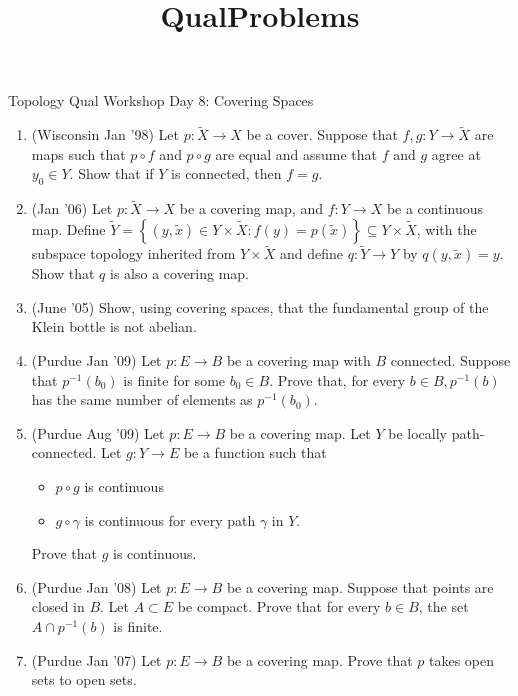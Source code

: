 \documentclass[psamsfonts, 11pt, reqno]{amsart}
\title{QualProblems}
\renewcommand{\tilde}{\widetilde}
\begin{document}
\begin{center}
\begin{large}
Topology Qual Workshop Day 8: Covering Spaces
\end{large}
\end{center}
\vspace{.25in}

\begin{enumerate}

\item (Wisconsin Jan '98) Let $p: \tilde{X} \rightarrow X$ be a cover. Suppose that $f,g: Y \rightarrow \tilde{X}$ are maps
such that $p \circ f$ and $p \circ g$ are equal and assume that $f$ and $g$ agree at $y_0 \in Y$.  Show that if
$Y$ is connected, then $f = g$.

\vfill

\item (Jan '06) Let $p: \tilde{X} \rightarrow X$ be a covering map, and $f: Y \rightarrow X$ be a continuous map.  Define
$\tilde{Y} = \left\lbrace (y, \tilde{x}) \in Y \times \tilde{X} : f(y) = p(\tilde{x}) \right\rbrace \subseteq Y \times \tilde{X}$,
with the subspace topology inherited from $Y \times \tilde{X}$ and define $q: \tilde{Y} \rightarrow Y$ by
$q(y,\tilde{x}) = y$.  Show that $q$ is also a covering map.

\vfill

\item (June '05) Show, using covering spaces, that the fundamental group of the Klein bottle is not
abelian.

\vfill

\item (Purdue Jan '09) Let $p: E \rightarrow B$ be a covering map with $B$ connected.  Suppose that $p^{-1}(b_0)$ is
finite for some $b_0 \in B$.  Prove that, for every $b \in B, p^{-1}(b)$ has the same number of elements as $p^{-1}(b_0)$.

\vfill

\item (Purdue Aug '09) Let $p: E \rightarrow B$ be a covering map.  Let $Y$ be locally path-connected.  Let
$g: Y\rightarrow E$ be a function such that 
\begin{itemize}
\item $p \circ g$ is continuous
\item $g \circ \gamma$ is continuous for every path $\gamma$ in $Y$.
\end{itemize}
Prove that $g$ is continuous.

\vfill

\item (Purdue Jan '08) Let $p: E \rightarrow B$ be a covering map.  Suppose that points are closed in $B$.
Let $A \subset E$ be compact.  Prove that for every $b \in B$, the set $A \cap p^{-1}(b)$ is finite.

\vfill

\item (Purdue Jan '07) Let $p : E\rightarrow B$ be a covering map.  Prove that $p$ takes open sets to open sets.

\vfill


\end{enumerate}
\end{document}
